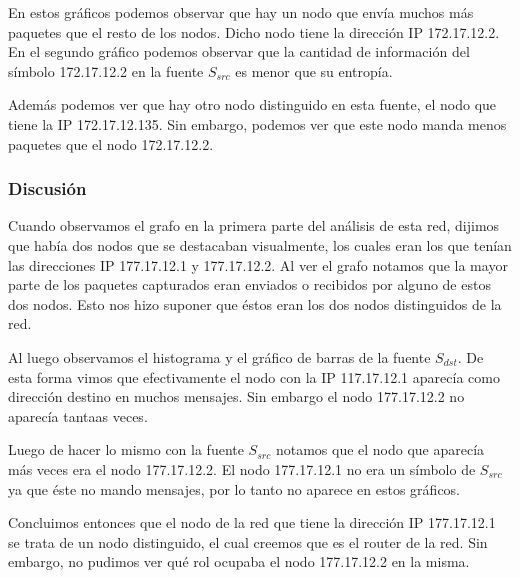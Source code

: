 En estos gráficos podemos observar que hay un nodo que envía muchos más paquetes que el resto de los nodos. Dicho nodo tiene la dirección IP 172.17.12.2. En el segundo gráfico podemos observar que la cantidad de información del símbolo 172.17.12.2 en la fuente $S_{src}$ es menor que su entropía.

Además podemos ver que hay otro nodo distinguido en esta fuente, el nodo que tiene la IP 172.17.12.135. Sin embargo, podemos ver que este nodo manda menos paquetes que el nodo 172.17.12.2.
 
\subsubsection{Discusión}

Cuando observamos el grafo en la primera parte del análisis de esta red, dijimos que había dos nodos que se destacaban visualmente, los cuales eran los que tenían las direcciones IP 177.17.12.1 y 177.17.12.2. Al ver el grafo notamos que la mayor parte de los paquetes capturados eran enviados o recibidos por alguno de estos dos nodos. Esto nos hizo suponer que éstos eran los dos nodos distinguidos de la red.

Al luego observamos el histograma y el gráfico de barras de la fuente $S_{dst}$. De esta forma vimos que efectivamente el nodo con la IP 117.17.12.1 aparecía como dirección destino en muchos mensajes. Sin embargo el nodo 177.17.12.2 no aparecía tantaas veces.

Luego de hacer lo mismo con la fuente $S_{src}$ notamos que el nodo que aparecía más veces era el nodo 177.17.12.2. El nodo 177.17.12.1 no era un símbolo de $S_{src}$ ya que éste no mando mensajes, por lo tanto no aparece en estos gráficos.

Concluimos entonces que el nodo de la red que tiene la dirección IP 177.17.12.1 se trata de un nodo distinguido, el cual creemos que es el router de la red. Sin embargo, no pudimos ver qué rol ocupaba el nodo 177.17.12.2 en la misma.